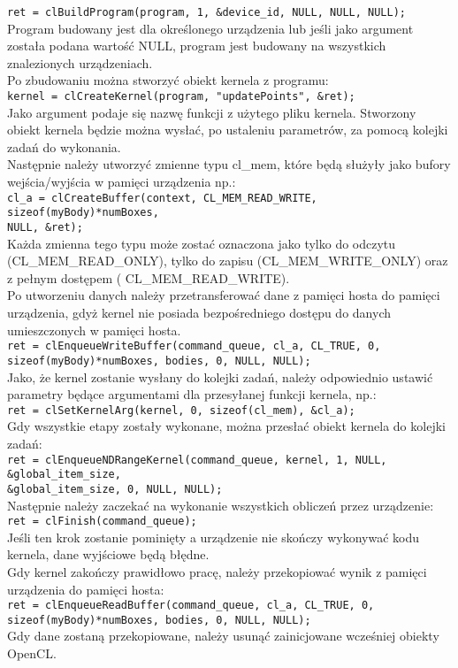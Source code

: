 \centering\verb+ret = clBuildProgram(program, 1, &device_id, NULL, NULL, NULL);+\\\flushleft
Program budowany jest dla określonego urządzenia lub jeśli jako argument została podana wartość NULL, program jest budowany na wszystkich znalezionych urządzeniach. \\
Po zbudowaniu można stworzyć obiekt kernela z programu:\\
\centering\verb+kernel = clCreateKernel(program, "updatePoints", &ret);+\\\flushleft
Jako argument podaje się nazwę funkcji z użytego pliku kernela. Stworzony obiekt kernela będzie można wysłać, po ustaleniu parametrów, za pomocą kolejki zadań do wykonania. \\
Następnie należy utworzyć zmienne typu cl\_mem, które będą służyły jako bufory wejścia/wyjścia w pamięci urządzenia np.:\\
\centering\verb+cl_a = clCreateBuffer(context, CL_MEM_READ_WRITE, sizeof(myBody)*numBoxes,+\\
\verb+NULL, &ret);+\\\flushleft
Każda zmienna tego typu może zostać oznaczona jako tylko do odczytu (CL\_MEM\_READ\_ONLY), tylko do zapisu (CL\_MEM\_WRITE\_ONLY) oraz z pełnym dostępem ( CL\_MEM\_READ\_WRITE). \\
Po utworzeniu danych należy przetransferować dane z pamięci hosta do pamięci urządzenia, gdyż kernel nie posiada bezpośredniego dostępu do danych umieszczonych w pamięci hosta. \\
\centering\verb+ret = clEnqueueWriteBuffer(command_queue, cl_a, CL_TRUE, 0,+\\
\verb+sizeof(myBody)*numBoxes, bodies, 0, NULL, NULL);+\\\flushleft
Jako, że kernel zostanie wysłany do kolejki zadań, należy odpowiednio ustawić parametry będące argumentami dla przesyłanej funkcji kernela, np.: \\
\centering\verb+ret = clSetKernelArg(kernel, 0, sizeof(cl_mem), &cl_a);+\\\flushleft
Gdy wszystkie etapy zostały wykonane, można przesłać obiekt kernela do kolejki zadań: \\
\centering\verb+ret = clEnqueueNDRangeKernel(command_queue, kernel, 1, NULL, &global_item_size,+\\
\verb+&global_item_size, 0, NULL, NULL);+\\\flushleft
Następnie należy zaczekać na wykonanie wszystkich obliczeń przez urządzenie:\\
\centering\verb+ret = clFinish(command_queue);+\\\flushleft
Jeśli ten krok zostanie pominięty a urządzenie nie skończy wykonywać kodu kernela, dane wyjściowe będą błędne. \\
Gdy kernel zakończy prawidłowo pracę, należy przekopiować wynik z pamięci urządzenia do pamięci hosta: \\
\centering\verb+ret = clEnqueueReadBuffer(command_queue, cl_a, CL_TRUE, 0,+\\
\verb+sizeof(myBody)*numBoxes, bodies, 0, NULL, NULL);+\\\flushleft
Gdy dane zostaną przekopiowane, należy usunąć zainicjowane wcześniej obiekty OpenCL. \\

